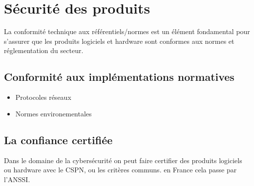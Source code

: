 

\section{Sécurité des produits}

La conformité technique aux référentiels/normes est un élément fondamental pour s'assurer que les produits logiciels et hardware sont conformes aux normes et réglementation du secteur.

\subsection{Conformité aux implémentations normatives}
\begin{itemize}
	\item Protocoles réseaux
	\item Normes environementales
\end{itemize}

\subsection{La confiance certifiée}

Dans le domaine de la cybersécurité on peut faire certifier des produits logiciels ou hardware avec  le CSPN, ou les critères communs. en France cela passe par l'ANSSI.
